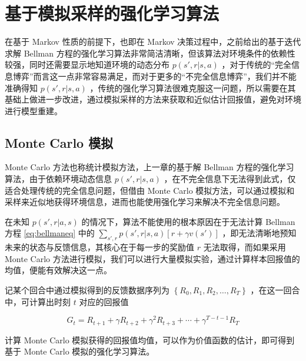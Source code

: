 
\chapter{基于模拟采样的强化学习算法}

在基于 Markov 性质的前提下，也即在 Markov 决策过程中，之前给出的基于迭代求解 Bellman 方程的强化学习算法非常简洁清晰，但该算法对环境条件的依赖性较强，同时还需要显示地知道环境的动态分布 $p(s',r|s,a)$ ，对于传统的“完全信息博弈”而言这一点非常容易满足，而对于更多的“不完全信息博弈”，我们并不能准确得知 $p(s',r|s,a)$ ，传统的强化学习算法很难克服这一问题\cite{sutton2018reinforcement}，所以需要在其基础上做进一步改进，通过模拟采样的方法来获取和近似估计回报值，避免对环境进行模型重建。

\section{Monte Carlo 模拟}

Monte Carlo 方法\cite{goodfellow2016deep}\cite{robert2013monte}也称统计模拟方法，上一章的基于解 Bellman 方程的强化学习算法，由于依赖环境动态信息 $p(s',r|s,a)$ ，在不完全信息下无法得到此式，仅适合处理传统的完全信息问题，但借由 Monte Carlo 模拟方法，可以通过模拟和采样来近似地获得环境信息，进而也能使用强化学习来解决不完全信息问题。

在未知 $p(s',r|a,s)$ 的情况下，算法不能使用的根本原因在于无法计算 Bellman 方程 \ref{eq:bellmaneq} 中的 $\sum_{s',r}p(s',r|s,a)[r+\gamma v(s')]$ ，即无法清晰地预知未来的状态与反馈信息，其核心在于每一步的奖励值 $r$ 无法取得，而如果采用 Monte Carlo 方法进行模拟，我们可以进行大量模拟实验，通过计算样本回报值的均值，便能有效解决这一点。

记某个回合中通过模拟得到的反馈数据序列为 $\left\{R_0, R_1, R_2, \ldots, R_T\right\}$ ，在这一回合中，可计算出时刻 $t$ 对应的回报值

\begin{equation}
    G_t = R_{t+1} + \gamma R_{t+2} + \gamma^2 R_{t+3} + \cdots + \gamma^{T-t-1} R_T
\end{equation}

计算 Monte Carlo 模拟获得的回报值均值，可以作为价值函数的估计，即可得到基于 Monte Carlo 模拟的强化学习算法。

